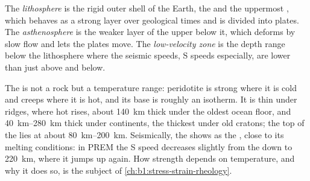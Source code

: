 \begin{definition}
\label{def:b1:layered-earth:lithosphere}
The \emph{lithosphere} is the rigid outer shell of the
Earth, the  and the uppermost , which behaves as a strong layer
over geological times and is divided into plates. The
\emph{asthenosphere} is the weaker layer of the upper
 below it, which deforms by slow flow and lets the plates move. The
\emph{low-velocity zone} is the depth range below the
lithosphere where the seismic speeds, S speeds especially, are lower than just
above and below.
\end{definition}

The  is not a rock but a temperature range:  peridotite is
strong where it is cold and creeps where it is hot, and its base is roughly an
isotherm. It is thin under ridges, where hot  rises, about
\qty{140}{km} thick under the oldest ocean floor, and \qtyrange{40}{280}{km}
thick under continents, the thickest under old cratons; the top of the
 lies at about \qtyrange{80}{200}{km}. Seismically, the
 shows as the , close to its melting conditions:
in PREM the S speed decreases slightly from the  down to \qty{220}{km},
where it jumps up again. How strength depends on temperature, and why it does
so, is the subject of \cref{ch:b1:stress-strain-rheology}.

